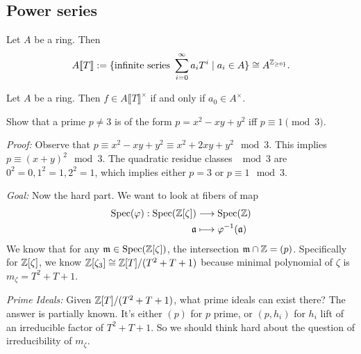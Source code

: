 \subsection{Power series}

\begin{definition}
    Let $A$ be a ring. Then 
    $$A\llbracket T \rrbracket := \{ \text{infinite series } \sum_{i=0}^\infty a_iT^i \mid a_i \in A \} \cong A^{\mathbb{Z}_{\geq 0\}}}.$$
\end{definition}

\begin{proposition}
    Let $A$ be a ring. Then $f\in A\llbracket T \rrbracket^\times$ if and only if $a_0\in A^\times$.
\end{proposition}
\newpage

\begin{exercise}
    Show that a prime $p\neq 3$ is of the form $p=x^2-xy+y^2$ iff $p\equiv 1 \pmod{3}$.
\end{exercise}

\textit{Proof:} %
Observe that $p\equiv x^2-xy+y^2 \equiv x^2+2xy+y^2 \mod 3$. This implies $p\equiv(x+y)^2 \mod 3$. The quadratic residue classes $\mod 3$ are $0^2=0, 1^2=1, 2^2=1$, which implies either $p=3$ or $p\equiv 1 \mod 3$.

\textit{Goal:} Now the hard part. We want to look at fibers of map
\begin{align*}
\operatorname{Spec}(\varphi): \operatorname{Spec}(\mathbb{Z}[\zeta])&\longrightarrow \operatorname{Spec}(\mathbb{Z}) \\
\mathfrak{a} &\longmapsto \varphi^{-1}(\mathfrak{a})    
\end{align*}
We know that for any 
$\mathfrak{m} \in \operatorname{Spec}(\mathbb{Z}[\zeta])$, the intersection $\mathfrak{m} \cap \mathbb{Z} = (p)$. Specifically for $\mathbb{Z}[\zeta]$, we know $\mathbb{Z}[\zeta_3] \cong \mathbb{Z}[T]/(T^2+T+1)$ because minimal polynomial of $\zeta$ is $m_\zeta = T^2+T+1$. 

\textit{Prime Ideals:} Given $\mathbb{Z}[T]/(T^2+T+1)$, what prime ideals can exist there? The answer is partially known. It's either $(p)$ for $p$ prime, or $(p, h_i)$ for $h_i$ lift of an irreducible factor of $T^2+T+1$. So we should think hard about the question of irreducibility of $m_\zeta$.

